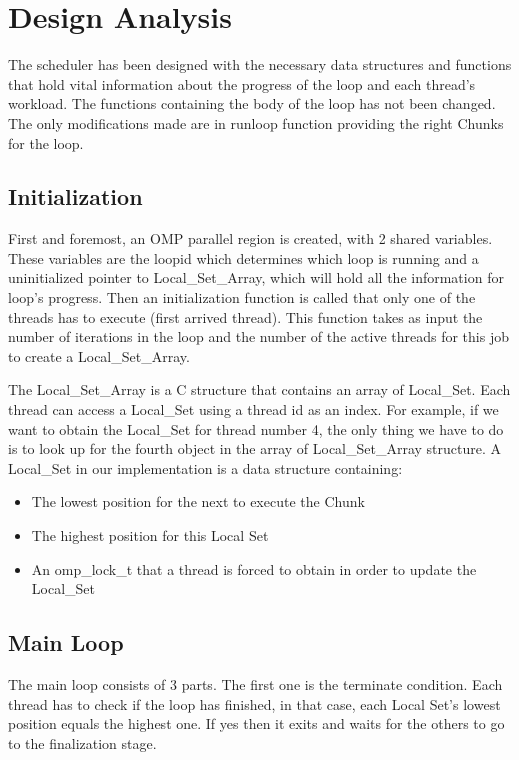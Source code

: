 \documentclass[12pt,a4paper]{article}
\newcommand{\sectionVspacing}{\vspace{15pt}}
\begin{document}
\sectionVspacing

\section{Design Analysis}

The scheduler has been designed with the necessary data structures and functions that hold vital information about the progress of the loop and each thread's workload. The functions containing the body of the loop has not been changed. The only modifications made are in runloop function providing the right Chunks for the loop.

\subsection{Initialization}
First and foremost, an OMP parallel region is created, with 2 shared variables. These variables are the loopid which determines which loop is running and a uninitialized pointer to Local\_Set\_Array, which will hold all the information for loop's progress. Then an initialization function is called that only one of the threads has to execute (first arrived thread). This function takes as input the number of iterations in the loop and the number of the active threads for this job to create a Local\_Set\_Array.

The Local\_Set\_Array is a C structure that contains an array of Local\_Set. Each thread can access a Local\_Set using a thread id as an index. For example, if we want to obtain the Local\_Set for thread number 4, the only thing we have to do is to look up for the fourth object in the array of Local\_Set\_Array structure. A Local\_Set in our implementation is a data structure containing:

\begin{itemize}
  \item The lowest position for the next to execute the Chunk
  \item The highest position for this Local Set
  \item An omp\_lock\_t that a thread is forced to obtain in order to update the Local\_Set
\end{itemize}

\subsection{Main Loop}
The main loop consists of 3 parts. The first one is the terminate condition. Each thread has to check if the loop has finished, in that case, each Local Set's lowest position equals the highest one. If yes then it exits and waits for the others to go to the finalization stage.
\end{document}
